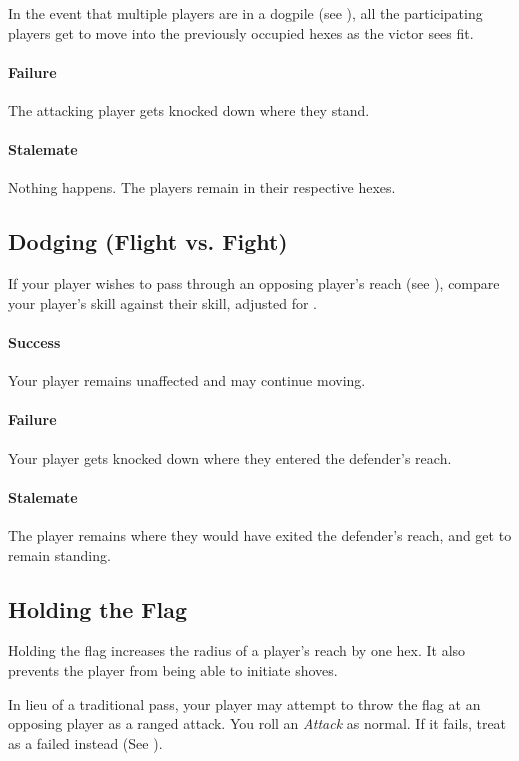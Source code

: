 \begin{note}
In the event that multiple players are in a dogpile (see ), all the participating players get to move into the previously occupied hexes as the victor sees fit.
\end{note}
\paragraph{Failure}
The attacking player gets knocked down where they stand.
\paragraph{Stalemate}
Nothing happens.
The players remain in their respective hexes.

\subsection{Dodging (Flight vs. Fight)}
If your player wishes to pass through an opposing player's reach (see ), compare your player's \flight{} skill against their \fight{} skill, adjusted for \fate{}.

\paragraph{Success}
Your player remains unaffected and may continue moving.
\paragraph{Failure}
Your player gets knocked down where they entered the defender's reach.
\paragraph{Stalemate}
The player remains where they would have exited the defender's reach, and get to remain standing.

\subsection{Holding the Flag}
Holding the flag increases the radius of a player's reach by one hex.
It also prevents the player from being able to initiate shoves.

In lieu of a traditional pass, your player may attempt to throw the flag at an opposing player as a ranged attack.
You roll an \textit{Attack} as normal.
If it fails, treat as a failed \throw{} instead (See ).

